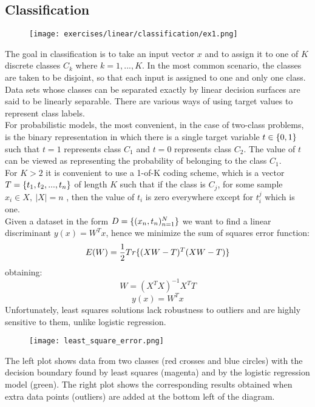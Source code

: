 \subsection{Classification}


\begin{figure}[H]
    \centering
    \texttt{[image: exercises/linear/classification/ex1.png]}
\end{figure}

The goal in classification is to take an input vector $x$ and to assign it to one of $K$  discrete classes $C_k$ where $k=1,...,K$. In the most common scenario, the classes are taken to be disjoint, so that each input is assigned to one and only one class. Data sets whose classes can be separated exactly by linear decision surfaces are said to be linearly separable. There are various ways of using target values to represent class labels.\\
For probabilistic models, the most convenient, in the case of two-class problems, is the binary representation in which there is a single target variable $t \in \lbrace{0,1}\rbrace$ such that $t=1$ represents class $C_1$  and $t=0$  represents class $C_2$. The value of $t$ can be viewed as representing the probability of belonging to the class $C_1$.\\
For $K>2$  it is convenient to use a 1-of-K coding scheme, which is a vector $T=\lbrace{t_1,t_2,...,t_n}\rbrace$ of length $K$ such that if the class is $C_j$, for some sample $x_i \in X,\ |X|=n$ , then the value of $t_i$ is zero everywhere except for $t_i^j$ which is one. \\
Given a dataset in the form $D=\lbrace{(x_n,t_n)^N_{n=1}}\rbrace$ we want to find a linear discriminant $y(x)=W^Tx$, hence we minimize the sum of squares error function:
\[E(W)=\frac{1}{2}Tr\lbrace{(XW-T)^T(XW-T)}\rbrace\]
obtaining:
\[W=(X^TX)^{-1}X^TT\]
\[y(x)=W^Tx\]
Unfortunately, least squares solutions lack robustness to outliers and are highly sensitive to them, unlike logistic regression.

\begin{figure}[H]
    \centering
    \texttt{[image: least\_square\_error.png]}
\end{figure}
The left plot shows data from two classes (red crosses and blue circles) with the decision boundary found by least squares (magenta) and by the logistic regression model (green). The right plot shows the corresponding results obtained when extra data points (outliers) are added at the bottom left of the diagram.


